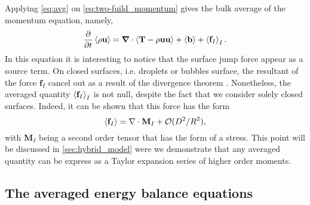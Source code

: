Applying \ref{eq:avg} on \ref{eq:two-fuild_momentum} gives the bulk average of the momentum equation, namely,
\begin{equation}
    \frac{\partial}{\partial t} 
        \left<\rho\textbf{u}\right>
    = \bm{\nabla} \cdot \left<
        \textbf{T}
        -  \rho \textbf{u} \textbf{u}\right> 
    + \left<\textbf{b}\right>
    + \left<\textbf{f}_I\right>_I.
    \label{eq:avg_momentum}
\end{equation}
In this equation it is interesting to notice that the surface jump force appear as a source term. 
On closed surfaces, i.e. droplets or bubbles surface, the resultant of the force $\textbf{f}_I$ cancel out as a result of the divergence theorem \citep{tryggvason2011direct}. 
Nonetheless, the averaged quantity $\left<\textbf{f}_I\right>_I$ is not null, despite the fact that we consider solely closed surfaces.
Indeed, it can be shown that this force has the form 
\begin{equation*}
    \left<\textbf{f}_I\right>
    = \nabla \cdot \textbf{M}_I + \mathcal{O}(D^2/R^2),
\end{equation*} 
with $\textbf{M}_I$ being a second order tensor that has the form of a stress. 
This point will be discussed in \ref{sec:hybrid_model} were we demonstrate that any averaged quantity can be express as a Taylor expansion series of higher order moments. 

\subsection{The averaged energy balance equations}

